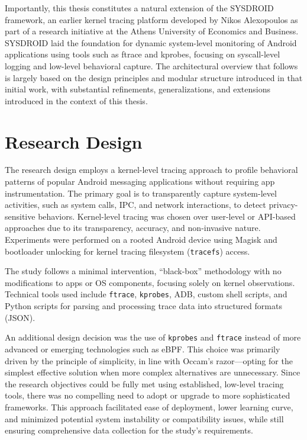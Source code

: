 \documentclass[a4paper,12pt]{report}
\begin{document}
Importantly, this thesis constitutes a natural extension of the SYSDROID framework, an earlier kernel tracing platform developed by Nikos Alexopoulos as part of a research initiative at the Athens University of Economics and Business. SYSDROID laid the foundation for dynamic system-level monitoring of Android applications using tools such as ftrace and kprobes, focusing on syscall-level logging and low-level behavioral capture. The architectural overview that follows is largely based on the design principles and modular structure introduced in that initial work, with substantial refinements, generalizations, and extensions introduced in the context of this thesis.

\section{Research Design}

The research design employs a kernel-level tracing approach to profile behavioral patterns of popular Android messaging applications without requiring app instrumentation. The primary goal is to transparently capture system-level activities, such as system calls, IPC, and network interactions, to detect privacy-sensitive behaviors. Kernel-level tracing was chosen over user-level or API-based approaches due to its transparency, accuracy, and non-invasive nature. Experiments were performed on a rooted Android device using Magisk and bootloader unlocking for kernel tracing filesystem (\texttt{tracefs}) access.

The study follows a minimal intervention, ``black-box'' methodology with no modifications to apps or OS components, focusing solely on kernel observations. Technical tools used include \texttt{ftrace}, \texttt{kprobes}, ADB, custom shell scripts, and Python scripts for parsing and processing trace data into structured formats (JSON).

An additional design decision was the use of \texttt{kprobes} and \texttt{ftrace} instead of more advanced or emerging technologies such as eBPF. This choice was primarily driven by the principle of simplicity, in line with Occam's razor---opting for the simplest effective solution when more complex alternatives are unnecessary. Since the research objectives could be fully met using established, low-level tracing tools, there was no compelling need to adopt or upgrade to more sophisticated frameworks. This approach facilitated ease of deployment, lower learning curve, and minimized potential system instability or compatibility issues, while still ensuring comprehensive data collection for the study's requirements.
\end{document}

